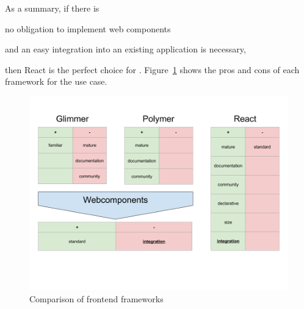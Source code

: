 As a summary, if there is
\begin{enumerate*}[label=(\arabic*)]
  \item no obligation to implement web components
  \item and an easy integration into an existing application is necessary,
\end{enumerate*}
then React is the perfect choice for \cmvs{}.
Figure~\ref{fig:implementation:frontend-frameworks} shows the pros and cons of each framework for the use case.

\begin{figure}[h]
  \centering
  \includegraphics[width=\textwidth]{images/frontend-frameworks.png}
  \caption{Comparison of frontend frameworks}\label{fig:implementation:frontend-frameworks}
\end{figure}

